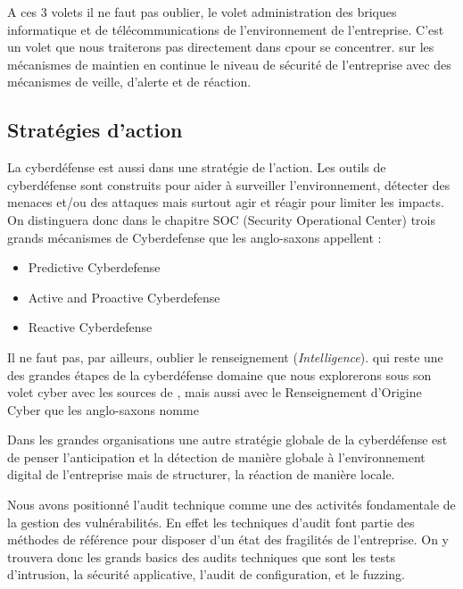 A ces 3 volets il ne faut pas oublier, le volet administration des briques informatique et de télécommunications de l’environnement de l’entreprise. C’est un volet que nous traiterons pas directement dans c\edoc pour se concentrer. sur les mécanismes de maintien en continue le niveau de sécurité de l’entreprise  avec des mécanismes de veille, d’alerte et de réaction.




\subsection{Stratégies d'action}

La cyberdéfense est aussi dans une stratégie de l'action. Les outils de cyberdéfense sont construits pour aider à surveiller l'environnement, détecter des menaces et/ou des attaques mais surtout agir et réagir pour limiter les impacts.
On distinguera donc dans le chapitre SOC (Security Operational Center) trois grands mécanismes de Cyberdefense que les anglo-saxons appellent : 

\begin{itemize}
	\item Predictive Cyberdefense
	\item Active  and Proactive Cyberdefense
	\item Reactive Cyberdefense 
\end{itemize}

Il ne faut pas, par ailleurs, oublier  le renseignement (\textit{Intelligence}). qui reste une des grandes étapes de la cyberdéfense domaine que nous explorerons sous son volet cyber avec les sources de , mais aussi avec le Renseignement d'Origine Cyber que les anglo-saxons nomme 

Dans les grandes organisations une autre stratégie globale de la cyberdéfense est de penser l'anticipation et la détection de manière globale à l'environnement digital de l'entreprise mais de structurer, la réaction de manière locale. 


Nous avons positionné l'audit technique comme une des activités fondamentale de la gestion des vulnérabilités.
En effet les techniques d'audit font partie des méthodes de référence pour disposer d'un état des fragilités de l'entreprise. On y trouvera donc les grands basics des audits techniques que sont les tests d'intrusion, la sécurité applicative, l'audit de configuration, et le fuzzing.

